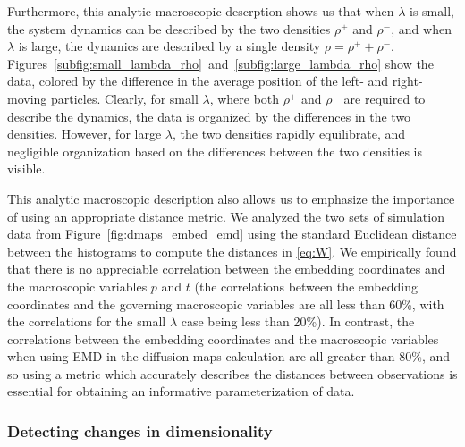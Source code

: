 \documentclass[3p]{elsarticle}
\begin{document}
Furthermore, this analytic macroscopic descrption shows us that when $\lambda$ is small, the system dynamics can be described by the two densities $\rho^+$ and $\rho^-$, and when $\lambda$ is large, the dynamics are described by a single density $\rho = \rho^+ + \rho^-$. 
%
Figures~\ref{subfig:small_lambda_rho}~and~\ref{subfig:large_lambda_rho} show the data, colored by the difference in the average position of the left- and right-moving particles. 
%
Clearly, for small $\lambda$, where both $\rho^+$ and $\rho^-$ are required to describe the dynamics, the data is organized by the differences in the two densities. 
%
However, for large $\lambda$, the two densities rapidly equilibrate, and negligible organization based on the differences between the two densities is visible.  


This analytic macroscopic description also allows us to emphasize the importance of using an appropriate distance metric.
%
We analyzed the two sets of simulation data from Figure~\ref{fig:dmaps_embed_emd} using the standard Euclidean distance between the histograms to compute the distances in \eqref{eq:W}.
%
We empirically found that there is no appreciable correlation between the embedding coordinates and the macroscopic variables $p$ and $t$ (the correlations between the embedding coordinates and the governing macroscopic variables are all less than 60\%, with the correlations for the small $\lambda$ case being less than 20\%). 
%
In contrast, the correlations between the embedding coordinates and the macroscopic variables when using EMD in the diffusion maps calculation are all greater than 80\%, and so using a metric which accurately describes the distances between observations is essential for obtaining an informative parameterization of data. 

\subsubsection{Detecting changes in dimensionality}
\end{document}
